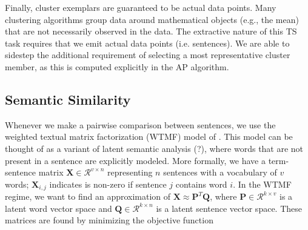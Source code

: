 \documentclass{sig-alternate}
\begin{document}
Finally, cluster exemplars are guaranteed to be actual data points. Many 
clustering algorithms group data around mathematical objects (e.g., the
mean) that are not necessarily observed in the data. The extractive nature of
this TS task requires that we emit actual data points (i.e. sentences).
We are able to sidestep 
the additional requirement of selecting a most
representative cluster member, as this is computed explicitly in the AP 
algorithm. 













\subsection{Semantic Similarity}\label{subsec:semsim}

Whenever we make a pairwise comparison between sentences, we use the weighted
textual matrix factorization (WTMF) model of \cite{guo2012simple}. This 
model can be thought of as a variant of latent semantic analysis (?), 
where words that are not present in a sentence are explicitly modeled.
More formally, we have a term-sentence matrix 
$\mathbf{X}\in\mathcal{R}^{v \times n}$ representing $n$ sentences with a 
vocabulary of $v$ words; $\mathbf{X}_{i,j}$ indicates is non-zero if sentence
$j$ contains word $i$. In the WTMF regime, we want to find an approximation
of $\mathbf{X} \approx \mathbf{P}^T\mathbf{Q}$, where 
$\mathbf{P} \in \mathcal{R}^{k \times v}$ is a latent word vector space and
$\mathbf{Q} \in \mathcal{R}^{k \times n}$ is a latent sentence vector
space. These matrices are found by minimizing the objective function
\end{document}
